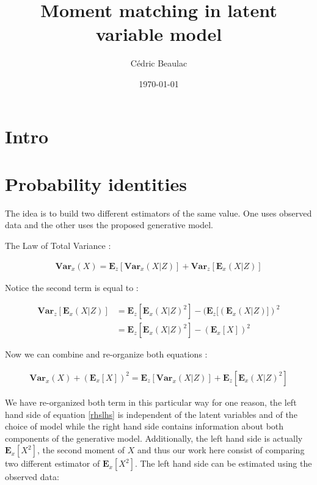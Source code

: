 \documentclass{article}
\newcommand{\Vx}{\textbf{Var}_x}
\newcommand{\Ex}{\textbf{E}_x}
\newcommand{\Vz}{\textbf{Var}_z}
\newcommand{\Ez}{\textbf{E}_z}
\begin{document}
\title{Moment matching in latent variable model}



\author{C\'edric Beaulac}


\date{\today}

\maketitle


\section{Intro}

\section{Probability identities}

The idea is to build two different estimators of the same value. One uses observed data and the other uses the proposed generative model. 

\bigskip

The Law of Total Variance :


\begin{align}
\Vx(X) = \Ez[\Vx(X|Z)] + \Vz[\Ex(X|Z)]
\end{align}

Notice the second term is equal to :

\begin{align}
\Vz[\Ex(X|Z)] &= \Ez[\Ex(X|Z)^2] - (\Ez[(\Ex(X|Z)])^2 \\
&= \Ez[\Ex(X|Z)^2] - (\Ex[X])^2
\end{align}

Now we can combine and re-organize both equations :

\begin{align}
\Vx(X)+ (\Ex[X])^2 = \Ez[\Vx(X|Z)] + \Ez[\Ex(X|Z)^2]
\label{rhslhs}
\end{align}

We have re-organized both term in this particular way for one reason, the left hand side of equation \ref{rhslhs} is independent of the latent variables and of the choice of model while the right hand side contains information about both components of the generative model. Additionally, the left hand side is actually $\Ex[X^2]$, the second moment of $X$ and thus our work here consist of comparing two different estimator of $\Ex[X^2]$. The left hand side can be estimated using the observed data:  
\end{document}

